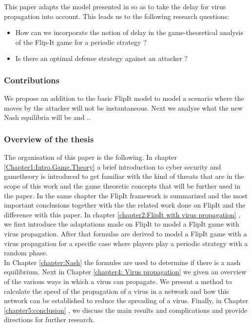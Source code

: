 This paper adapts the model presented in \cite{FlipIt} so as to take the delay for virus propagation into account.
This leads us to the following research questions:
\begin{itemize}
\item How can we incorporate the notion of delay in the game-theoretical analysis of the Flip-It game for a periodic strategy ?
\item Is there an optimal defense strategy against an attacker ? 
\end{itemize}



\subsubsection{Contributions}
We propose an addition to the basic FlipIt model to model a scenario where the moves by the attacker will not be instantaneous. Next we analyse what the new Nash equilibria will be and .. \\

\subsubsection{Overview of the thesis}

The organisation of this paper is the following.  In chapter \ref{Chapter1:Intro.Game.Theory}  a brief introduction to cyber security and gametheory is introduced to get familiar with the kind of threats that are in the scope of this work and the game theoretic concepts that will be further used in the paper. In the same chapter the FlipIt framework is summarized and the most important conclusions together with the the related work done on FlipIt and the difference with this paper.
In chapter \ref{chapter2:FlipIt with virus propagation} , we first introduce the adaptations made on FlipIt to model a FlipIt game with virus propagation. After that formulas are derived to model a FlipIt game with a virus propagation for a specific case where players play a periodic strategy with a random phase. \\
In Chapter \ref{chapter:Nash} the formules are used to determine if there is a nash equilibrium. 
Next in Chapter \ref{chapter4: Virus propagation} we given an overview of the various ways in which a virus can propagate. We present a method to calculate the speed of the propagation of a virus in a network and how this network can be established to reduce the spreading of a virus.
Finally, in Chapter \ref{chapter5:conclusion} , we discuss the main results and complications and provide directions for further research.


